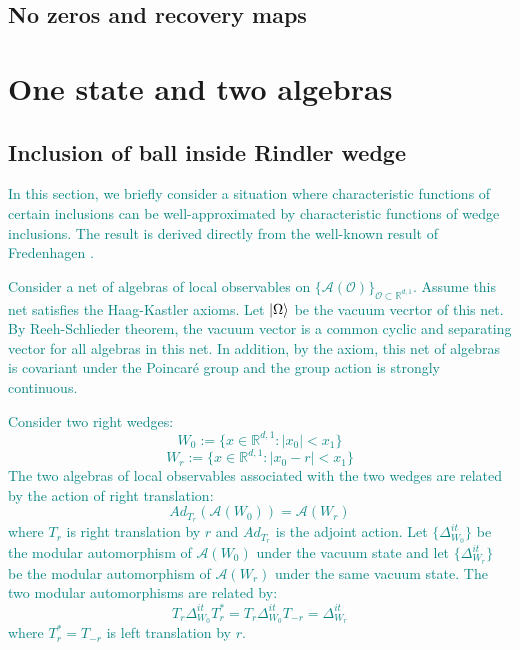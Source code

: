 \documentclass[a4paper,11pt]{article}
\theoremstyle{definition}
\newcommand{\YC}[1]{\textcolor{teal}{#1}}
\begin{document}
\subsection{No zeros and recovery maps}


\section{One state and two algebras}

\subsection{Inclusion of ball inside Rindler wedge}
\YC{
In this section, we briefly consider a situation where characteristic functions of certain inclusions can be well-approximated by characteristic functions of wedge inclusions. The result is derived directly from the well-known result of Fredenhagen \cite{fredenhagen}.}

\YC{
Consider a net of algebras of local observables on $\{\mathcal{A}(\mathcal{O})\}_{\mathcal{O}\subset\mathbb{R}^{d,1}}$. Assume this net satisfies the Haag-Kastler axioms. Let $\ket{\Omega}$ be the vacuum vecrtor of this net. By Reeh-Schlieder theorem, the vacuum vector is a common cyclic and separating vector for all algebras in this net. In addition, by the axiom, this net of algebras is covariant under the Poincaré group and the group action is strongly continuous.}

\YC{
Consider two right wedges:
\begin{equation}
    W_0 := \{x\in\mathbb{R}^{d,1}: |x_0| < x_1\}
\end{equation}
\begin{equation}
    W_{r} := \{x\in\mathbb{R}^{d,1}: |x_0 - r| < x_1 \}
\end{equation}
The two algebras of local observables associated with the two wedges are related by the action of right translation:
\begin{equation}
    Ad_{T_r}(\mathcal{A}(W_0)) = \mathcal{A}(W_r)
\end{equation}
where $T_r$ is right translation by $r$ and $Ad_{T_r}$ is the adjoint action. Let $\{\Delta_{W_0}^{it}\}$ be the modular automorphism of $\mathcal{A}(W_0)$ under the vacuum state and let $\{\Delta_{W_r}^{it}\}$ be the modular automorphism of $\mathcal{A}(W_r)$ under the same vacuum state. The two modular automorphisms are related by:
\begin{equation}
    T_r\Delta_{W_0}^{it}T_r^* = T_r\Delta_{W_0}^{it}T_{-r} = \Delta^{it}_{W_r}
\end{equation}
where $T_r^* = T_{-r}$ is left translation by $r$.
}
\end{document}
